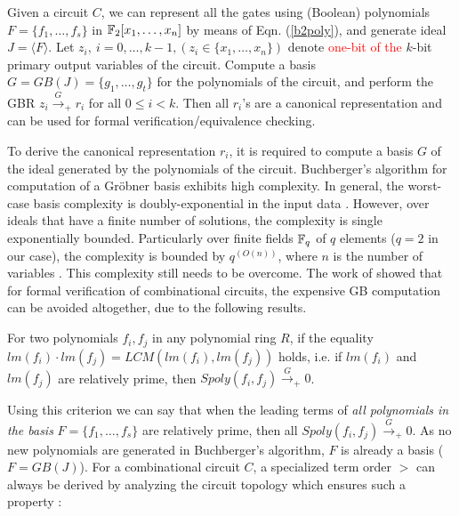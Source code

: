 \begin{Proposition}\label{prop:verif}
Given a circuit $C$, we can represent all the gates using (Boolean)
polynomials $F = \{f_1, \dots, f_s\}$ in ${\mathbb{F}}_2[x_1,\dots,x_n]$ by
means of Eqn. (\ref{b2poly}), and generate ideal $J  = \langle F \rangle$. Let
$z_i, ~i = 0,\dots,{k-1}, (z_i \in \{x_1,\dots,x_n\})$ denote \textcolor{red}{one-bit of the}
$k$-bit primary output variables   
of the circuit.  Compute a \Grobner basis $G = GB(J) =
\{g_1,\dots,g_t\}$ for the polynomials of the circuit, and perform the
GBR $z_i\xrightarrow{G}_+ r_i$ for all $0\leq i<k$. Then all $r_i$'s
are a canonical representation and can be used for formal
verification/equivalence checking. 
\end{Proposition}

To derive the canonical representation $r_i$, it is required to
compute a \Grobner basis $G$ of the ideal generated by the polynomials
of the circuit. Buchberger's algorithm for computation of a Gr\"obner
basis exhibits high complexity. In general, the worst-case \Grobner
basis complexity is doubly-exponential in the input data
\cite{Dube:gb-complexity}. However, over ideals that have a finite
number of solutions, the complexity is single exponentially
bounded. Particularly over finite fields ${\mathbb{F}}_{q}$ of $q$ elements ($q =
2$ in our case), the complexity is bounded by $q^{(O(n))}$, where $n$
is the number of variables \cite{gao:gf-gb-ms}. This complexity still
needs to be overcome. The work of \cite{lv:tcad2013} showed that for
formal verification of combinational circuits, the expensive GB
computation can be avoided altogether, due to the following results. 

\begin{Lemma}
\label{prod_criteria}
For two polynomials $f_i,f_j$  in any polynomial ring $R$, if the
equality $lm(f_i)\cdot lm(f_j) = LCM(lm(f_i),lm(f_j))$ holds, i.e. if
$lm(f_i)$ and $lm(f_j)$ are relatively prime, then 
$Spoly(f_i,f_j) \xrightarrow{G}_+ 0$.  
\end{Lemma}
 

Using this criterion we can say that when the leading terms of {\it all
polynomials in the basis} $F = \{f_1, \dots, f_s\}$ are relatively
prime, then all $Spoly(f_i,f_j)  \xrightarrow{G}_+ 0$.  As no new
polynomials are generated in Buchberger's algorithm, $F$ is already a
\Grobner basis ($F = GB(J)$). For a combinational
circuit $C$, a specialized term order $>$ can always be derived by
analyzing the circuit topology which ensures such a property
\cite{wienand:cav08} \cite{lv:tcad2013}:  

